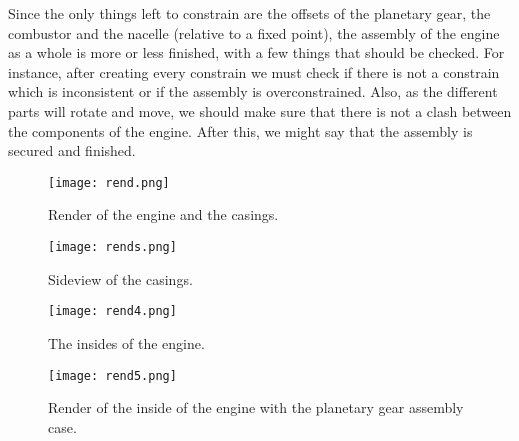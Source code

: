 \documentclass[12pt, letterpaper]{article}
\begin{document}
Since the only things left to constrain are the offsets of the planetary gear, the combustor and the nacelle (relative to a fixed point), the assembly of the engine as a whole is more or less finished, with a few things that should be checked. For instance, after creating every constrain we must check if there is not a constrain which is inconsistent or if the assembly is overconstrained. Also, as the different parts will rotate and move, we should make sure that there is not a clash between the components of the engine. After this, we might say that the assembly is secured and finished.

\begin{figure}[H]
	\centering
	\texttt{[image: rend.png]}
	\caption{Render of the engine and the casings.}
\end{figure}

\begin{figure}[H]
	\centering
	\texttt{[image: rends.png]}
	\caption{Sideview of the casings.}
\end{figure}

\begin{figure}[H]
	\centering
	\texttt{[image: rend4.png]}
	\caption{The insides of the engine.}
\end{figure}

\begin{figure}[H]
	\centering
	\texttt{[image: rend5.png]}
	\caption{Render of the inside of the engine with the planetary gear assembly case.}
\end{figure}
\renewcommand\refname{References}
\printbibliography
\end{document}
